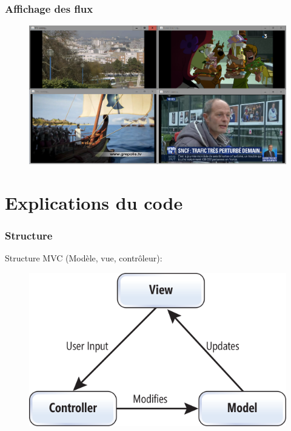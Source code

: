 \documentclass{beamer}
\begin{document}
\begin{frame}
\frametitle{Affichage des flux}

\begin{figure}
	\includegraphics[scale=0.25]{images/affichageFlux}
\end{figure}

\end{frame}


\section{Explications du code}

\begin{frame}
\frametitle{Structure}

Structure MVC (Modèle, vue, contrôleur): 

\begin{figure}
	\includegraphics[scale=0.5]{images/mvc}
\end{figure}

\end{frame}
\end{document}
